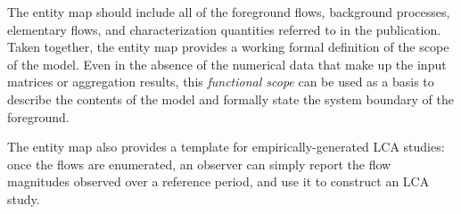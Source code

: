 The entity map should include all of the foreground flows, background processes, elementary flows, and characterization quantities referred to in the publication.  Taken together, the entity map provides a working formal definition of the scope of the model.  Even in the absence of the numerical data that make up the input matrices or aggregation results, this \emph{functional scope} can be used as a basis to describe the contents of the model and formally state the system boundary of the foreground.

The entity map also provides a template for empirically-generated LCA studies: once the flows are enumerated, an observer can simply report the flow magnitudes observed over a reference period, and use it to construct an LCA study.
